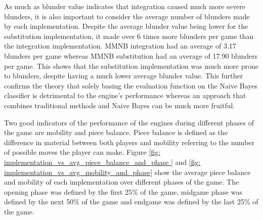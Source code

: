 



As much as blunder value indicates that integration caused much more severe blunders, it is also important to consider the average number of blunders made by each implementation. Despite the average blunder value being lower for the substitution implementation, it made over 6 times more blunders per game than the integration implementation. MMNB integration had an average of 3.17 blunders per game whereas MMNB substitution had an average of 17.90 blunders per game. This shows that the substitution implementation was much more prone to blunders, despite having a much lower average blunder value. This further 
confirms the theory that solely basing the evaluation function on the Naive Bayes classifier is detrimental to the engine's performance whereas an approach that combines traditional methods and Naive Bayes can be much more fruitful.


Two good indicators of the performance of the engines during different phases of the game are mobility and piece balance. Piece balance is defined as the difference in material between both players and mobility referring to the number of possible moves the player can make. Figure \ref{fig: implementation_vs_avg_piece_balance_and_phase } and \ref{fig: implementation_vs_avg_mobility_and_phase} show the average piece balance and mobility of each implementation over different phases of the game. The opening phase was defined by the first 25\% of the game, midgame phase was defined by the next 50\% of the game and endgame was defined by the last 25\% of the game.

